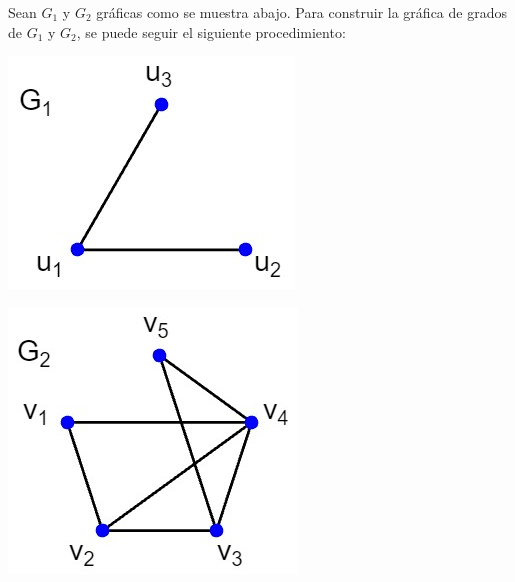 \documentclass[fleqn, 11pt]{beamer}
\begin{document}
    \begin{ejemplo}[breakable, pad at break = 4mm, beforeafter skip = 3mm]{}{}
        Sean $ G_1 $ y $ G_2 $ gráficas como se muestra abajo. Para construir la gráfica de grados de $ G_1 $ y $ G_2 $, se puede seguir el siguiente procedimiento: \vspace{3mm}

        \begin{center}
            \begin{minipage}[h]{0.3\linewidth}
                \includegraphics[width=0.9\linewidth]{Ejemplo_1/Ejemplo1_G1.jpg}
            \end{minipage} \hspace{0.1\linewidth}
            \begin{minipage}[h]{0.3\linewidth}
                \includegraphics[width=0.9\linewidth]{Ejemplo_1/Ejemplo1_G2.jpg}
            \end{minipage}
        \end{center} \vspace{3mm}


\end{ejemplo}
\end{document}
